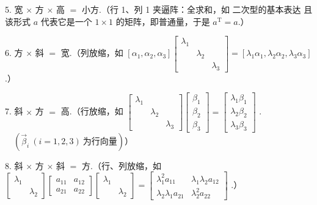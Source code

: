 
5. 宽 $\times$ 方 $\times$ 高 $=$ 小方.（行 1、列 1 夹逼阵：全求和，如
二次型的基本表达
且该形式 $a$ 代表它是一个 $1\times1$ 的矩阵，即普通量，于是 $a^{\mathrm T}=a$.）

6. 方 $\times$ 斜 $=$ 宽.（列放缩，如 $[\alpha_1,\alpha_2,\alpha_3]\begin{bmatrix}\lambda_1&&\\&\lambda_2&\\&&\lambda_3\end{bmatrix}=[\lambda_1\alpha_1,\lambda_2\alpha_2,\lambda_3\alpha_3]$ .）

7. 斜 $\times$ 方 $=$ 高.（行放缩，如 $\begin{bmatrix}\lambda_1&&\\&\lambda_2&\\&&\lambda_3\end{bmatrix}\begin{bmatrix}\beta_1\\\beta_2\\\beta_3\end{bmatrix}=\begin{bmatrix}\lambda_1\beta_1\\\lambda_2\beta_2\\\lambda_3\beta_3\end{bmatrix}$ . $\quad(\vec\beta_i\ (i=1,2,3)\ \text{为行向量})$）

8. 斜 $\times$ 方 $\times$ 斜 $=$ 方.（行、列放缩，如 $\begin{bmatrix}\lambda_1&\\&\lambda_2\end{bmatrix}\begin{bmatrix}a_{11}&a_{12}\\a_{21}&a_{22}\end{bmatrix}\begin{bmatrix}\lambda_1&\\&\lambda_2\end{bmatrix}=\begin{bmatrix}\lambda_1^2a_{11}&\lambda_1\lambda_2a_{12}\\\lambda_2\lambda_1a_{21}&\lambda_2^2a_{22}\end{bmatrix}$ .）

